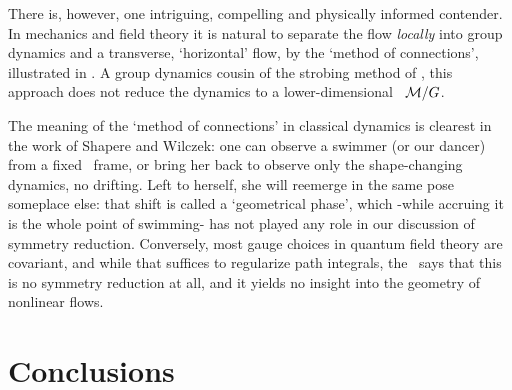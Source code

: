 \documentclass[aip,cha,reprint,
secnumarabic,
nofootinbib, tightenlines,
nobibnotes, showkeys, showpacs,
groupedaddress
]{revtex4-1}
\begin{document}
There is, however, one intriguing, compelling  and physically informed
contender. In mechanics and field theory it is natural to separate the
flow {\em locally} into group dynamics and a transverse, `horizontal'
flow, by the `method of
connections', illustrated in
. A group dynamics cousin of the strobing method
of , this approach does not reduce the dynamics to a
lower-dimensional \reducedsp\ ${\cal M}/G$.

The meaning of the `method of
connections' in classical dynamics is clearest in the work of Shapere
and Wilczek: one can observe a swimmer (or our dancer)
from a fixed \slice\ frame, or bring her back to observe only the
shape-changing dynamics, no drifting. Left to herself, she will reemerge
in the same pose someplace else: that shift is called a `geometrical
phase', which -while accruing it is the whole point of swimming- has not
played any role in our discussion of symmetry reduction. Conversely, most
gauge choices in quantum field theory are covariant, and while that
suffices to regularize path integrals, the \mslices\ says that this is no
symmetry reduction at all, and it yields no insight into the geometry of
nonlinear flows.


\section{Conclusions}
\label{s:concl}
\end{document}
